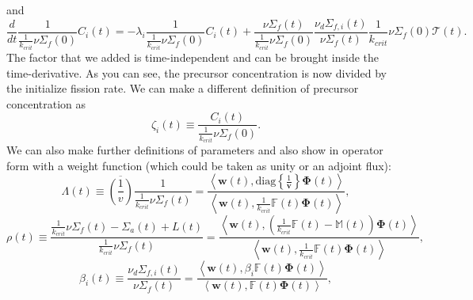 \documentclass{ansconf}
\numberwithin{equation}{section}
\begin{document}
 and
\begin{equation}
\frac{d}{dt}\frac{1}{\frac{1}{k_{crit}}\nu\Sigma_{f}\left(0\right)}C_{i}\left(t\right)=-\lambda_{i}\frac{1}{\frac{1}{k_{crit}}\nu\Sigma_{f}\left(0\right)}C_{i}\left(t\right)+\frac{\nu\Sigma_{f}\left(t\right)}{\frac{1}{k_{crit}}\nu\Sigma_{f}\left(0\right)}\frac{\nu_{d}\Sigma_{f,i}\left(t\right)}{\nu\Sigma_{f}\left(t\right)}\frac{1}{k_{crit}}\nu\Sigma_{f}\left(0\right)\mathcal{T}\left(t\right).
\end{equation}
The factor that we added is time-independent and can be brought
inside the time-derivative. As you can see, the precursor concentration
is now divided by the initialize fission rate. We can make a different
definition of precursor concentration as
\begin{equation}
\zeta_{i}\left(t\right)\equiv\frac{C_{i}\left(t\right)}{\frac{1}{k_{crit}}\nu\Sigma_{f}\left(0\right)}.
\end{equation}
We can also make further definitions of parameters and also show
in operator form with a weight function (which could be taken as unity or an adjoint flux):
\begin{equation}
\Lambda\left(t\right)\equiv\overline{\left(\frac{1}{v}\right)}\frac{1}{\frac{1}{k_{crit}}\nu\Sigma_{f}\left(t\right)}=\frac{\left\langle \mathbf{w}\left(t\right),\mathrm{diag}\left\lbrace\frac{1}{\mathbf{v}}\right\rbrace\boldsymbol{\Phi}\left(t\right)\right\rangle }{\left\langle \mathbf{w}\left(t\right),\frac{1}{k_{crit}}\mathbb{F}\left(t\right)\boldsymbol{\Phi}\left(t\right)\right\rangle },
\end{equation}
\begin{equation}
\rho\left(t\right)\equiv\frac{\frac{1}{k_{crit}}\nu\Sigma_{f}\left(t\right)-\Sigma_{a}\left(t\right)+L\left(t\right)}{\frac{1}{k_{crit}}\nu\Sigma_{f}\left(t\right)}=\frac{\left\langle \mathbf{w}\left(t\right),\left(\frac{1}{k_{crit}}\mathbb{F}\left(t\right)-\mathbb{M}\left(t\right)\right)\boldsymbol{\Phi}\left(t\right)\right\rangle }{\left\langle \mathbf{w}\left(t\right),\frac{1}{k_{crit}}\mathbb{F}\left(t\right)\boldsymbol{\Phi}\left(t\right)\right\rangle },
\end{equation}
\begin{equation}
\beta_{i}\left(t\right)\equiv\frac{\nu_{d}\Sigma_{f,i}\left(t\right)}{\nu\Sigma_{f}\left(t\right)}=\frac{\left\langle \mathbf{w}\left(t\right),\beta_{i}\mathbb{F}\left(t\right)\boldsymbol{\Phi}\left(t\right)\right\rangle }{\left\langle \mathbf{w}\left(t\right),\mathbb{F}\left(t\right)\boldsymbol{\Phi}\left(t\right)\right\rangle },
\end{equation}
\end{document}
